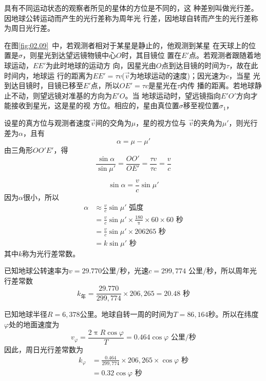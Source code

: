   具有不同运动状态的观察者所见的星体的方位是不同的，这
  种差别叫做光行差。因地球公转运动而产生的光行差称为周年光
  行差，因地球自转而产生的光行差称为周日光行差。

  在图\ref{fig:02.09}~中，若观测者相对于某星是静止的，他观测到某星
  在天球上的位置是$\sigma$，则星光到达望远镜物镜中心$O$时，其目镜位
  置在$E'$点。若观测者跟随着地球运动，$EE'$为此时地球的运动方
  向，因星光由$O$点到达目镜的时间为$\tau$，故在此时间内，地球运
  行的距离为$EE'=\tau v$($\vec{v}$为地球运动的速度)；因光速为$c$，当星
  光到达目镜时，目镜已移至$E'$点，所以$OE'=\tau c$是星光在$\tau$内传
  播的距离。若地球静止不动，则望远镜对准基的方向为$E'O$。当
  地球运动时，望远镜指向$E'O'$方向才能接收到星光，这是星的视
  方位。相应的，星由真位置$\sigma$移至视位置$\sigma_1$，

  设星的真方位与观测者速度$\vec{v}$间的交角为$\mu$，星的视方位与
$\vec{v}$的夹角为$\mu'$，则光行差为$\alpha$，且有
  \begin{equation*}
    \alpha=\mu-\mu'
  \end{equation*}
  由三角形$OO'E'$，得
  \begin{equation*}
    \frac{\sin\alpha}{\sin\mu'}=\frac{OO'}{OE'}=\frac{\tau v}{\tau c}=\frac{v}{c}
  \end{equation*}

\clearpage
  \begin{equation*}
    \sin\alpha=\frac{v}{c}\sin\mu'
  \end{equation*}
  因为$\alpha$很小，所以
  \begin{align*}
    \alpha & \approx\frac{v}{c}\sin\mu'\text{ 弧度}                                    \\
           & =\frac{v}{c}\sin\mu'\times\frac{180}{\uppi}\times 60 \times 60 \text{ 秒} \\
           & =\frac{v}{c}\sin\mu'\times 206265\text{ 秒}                               \\
           & =k\sin\mu'\text{ 秒}
  \end{align*}
  其中$k$称为光行差常数。

已知地球公转速率为$v=29.770$公里/秒，光速$c=299,774$
公里/秒，所以周年光行差常数
  \begin{equation*}
    k_\text{年}=\frac{29.770}{299,774}\times 206,265=20.48\text{ 秒}
  \end{equation*}

已知地球半径$R=6,378$公里。地球自转一周的时间为$T=
86,164$秒。所以在纬度$\varphi$处的地面速度为
\begin{equation*}
  v_\varphi=\frac{2\uppi R\cos\varphi}{T}=0.464\cos\varphi\text{ 公里/秒}
\end{equation*}
因此，周日光行差常数为
\begin{align*}
  k_\varphi & =\frac{0.464}{299,774}\times 206,265\times\cos\varphi\text{ 秒} \\
            & =0.32\cos\varphi\text{ 秒}
\end{align*}